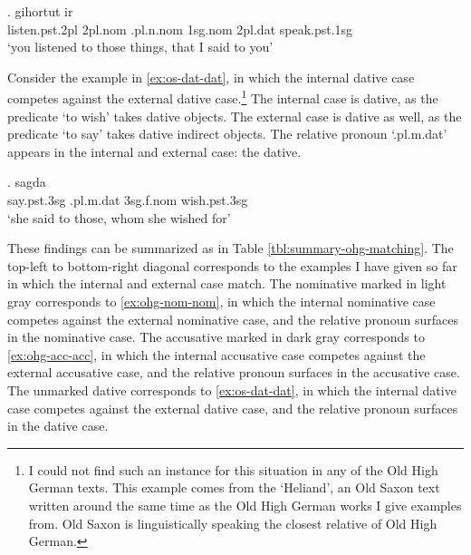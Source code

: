 \exg. gihortut ir    \\
 listen.\ac{pst}.2\ac{pl}\scsub{[acc]} 2\ac{pl}.\ac{nom} .\ac{pl}.\ac{n}.\ac{nom} 1\ac{sg}.\ac{nom} 2\ac{pl}.\ac{dat} speak.\ac{pst}.1\ac{sg}\scsub{[acc]}\\
 `you listened to those things, that I said to you' \label{ex:ohg-acc-acc}

Consider the example in \ref{ex:os-dat-dat}, in which the internal dative case competes against the external dative case.\footnote{
I could not find such an instance for this situation in any of the Old High German texts. This example comes from the `Heliand', an Old Saxon text written around the same time as the Old High German works I give examples from. Old Saxon is linguistically speaking the closest relative of Old High German.
}
The internal case is dative, as the predicate  `to wish' takes dative objects.
The external case is dative as well, as the predicate  `to say' takes dative indirect objects.
The relative pronoun  `.\ac{pl}.\ac{m}.\ac{dat}' appears in the internal and external case: the dative.

\exg. sagda   \\
 say.\ac{pst}.3\ac{sg}\scsub{[dat]} .\ac{pl}.\ac{m}.\ac{dat} 3\ac{sg}.\ac{f}.\ac{nom} wish.\ac{pst}.3\ac{sg}\scsub{[dat]}\\
 `she said to those, whom she wished for' \label{ex:os-dat-dat}

These findings can be summarized as in Table \ref{tbl:summary-ohg-matching}. The top-left to bottom-right diagonal corresponds to the examples I have given so far in which the internal and external case match. The nominative marked in light gray corresponds to \ref{ex:ohg-nom-nom}, in which the internal nominative case competes against the external nominative case, and the relative pronoun surfaces in the nominative case. The accusative marked in dark gray corresponds to \ref{ex:ohg-acc-acc}, in which the internal accusative case competes against the external accusative case, and the relative pronoun surfaces in the accusative case. The unmarked dative corresponds to \ref{ex:os-dat-dat}, in which the internal dative case competes against the external dative case, and the relative pronoun surfaces in the dative case.

